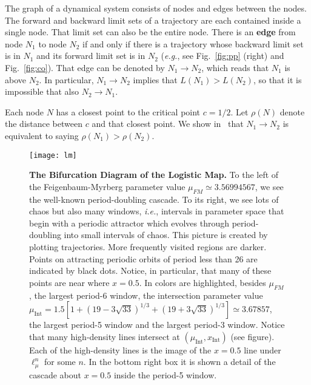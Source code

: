 \documentclass{article}
\def\INT{_\text{Int}}
\def\edge{\to}
\newcommand{\BF}{\boldmath}
\newcommand{\ie}{{\it{i.e.}}}
\newcommand{\eg}{{\it{e.g.}}}
\begin{document}
The graph of a dynamical system consists of nodes and edges between the nodes. 
The forward and backward limit sets of a trajectory are each contained inside a single node. That limit set can also be the entire node. 
There is an {\bf edge} from node $N_1$ to node $N_2$ if and only if there is a trajectory whose backward limit set is in $N_1$ and its forward limit set is in $N_2$ (\eg, see Fig.~\ref{fig:pp} (right) and Fig.~\ref{fig:co}). 
That edge can be denoted by {\BF $N_1\edge N_2$}, which reads that $N_1$ is above $N_2$.
In particular, $N_1\edge N_2$ implies that $L(N_1)>L(N_2)$, so that it is impossible that also $N_2\edge N_1$. 



Each node $N$ has a closest point to the critical point $c=1/2$.
Let $\rho(N)$ denote the distance between $c$ and that closest point.
We show in~\cite{DLY20} that $N_1\edge N_2$ is equivalent to saying $\rho(N_1)>\rho(N_2)$.

%
%
\begin{figure}
 \centering
 \texttt{[image: lm]}
 \caption{{\bf The Bifurcation Diagram of the Logistic Map.} To the left of the Feigenbaum-Myrberg parameter value $\mu_{FM}\simeq3.56994567$, we see the well-known period-doubling cascade. To its right, we see lots of chaos but also many windows, \ie, intervals in parameter space that begin with a periodic attractor which evolves through period-doubling into small intervals of chaos. This picture is created by plotting trajectories. More frequently visited regions are darker. Points on attracting periodic orbits of period less than 26 are indicated by black dots. Notice, in particular, that many of these points are near where $x=0.5$. In colors are highlighted, besides $\mu_{FM}$, the largest period-6 window, the intersection parameter value $\mu\INT=1.5[ 1 + (19-3\sqrt{33})^{1/3} + (19+3\sqrt{33})^{1/3} ]\simeq3.67857$, the largest period-5 window and the largest period-3 window. Notice that many high-density lines intersect at $(\mu\INT,x\INT)$ (see figure). Each of the high-density lines is the image of the $x=0.5$ line under $\ell^n_\mu$ for some $n$. In the bottom right box it is shown a detail of the cascade about $x=0.5$ inside the period-5 window.
 }
 \label{fig:lmbd}
\end{figure} 
\end{document}
